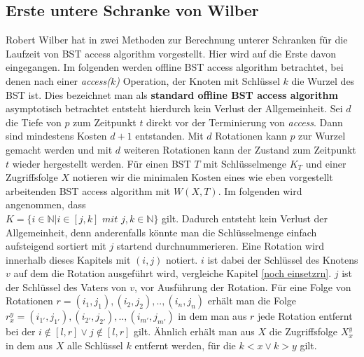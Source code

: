 \documentclass[a4paper,12pt]{article}
\begin{document}
\subsection{Erste untere Schranke von Wilber}
Robert Wilber hat in \cite{wilberLowerBounds} zwei Methoden zur Berechnung unterer Schranken für die Laufzeit von BST access algorithm vorgestellt. Hier wird auf die Erste davon eingegangen. Im folgenden werden offline BST access algorithm betrachtet, bei denen nach einer \textit{access($k$)} Operation, der Knoten mit Schlüssel $k$ die Wurzel des BST ist. Dies bezeichnet man als \textbf{standard offline BST access algorithm } asymptotisch betrachtet entsteht hierdurch kein Verlust der Allgemeinheit. Sei $d$ die Tiefe von $p$ zum Zeitpunkt $t$ direkt vor der Terminierung von \textit{access}. Dann sind mindestens Kosten $d + 1$ entstanden. Mit $d$ Rotationen kann $p$ zur Wurzel gemacht werden und mit $d$ weiteren Rotationen kann der Zustand zum Zeitpunkt $t$ wieder hergestellt werden.
Für einen BST $T$ mit Schlüsselmenge $K_T$ und einer Zugriffsfolge $X$ notieren wir die minimalen Kosten eines wie eben vorgestellt arbeitenden BST access algorithm mit $W(X, T)$. Im folgenden wird angenommen, dass \\
$K = \{  i \in \mathbb{N} \vert i \in \left[j,k\right] \textit{ mit } j,k \in  \mathbb{N} \} $ gilt. Dadurch entsteht kein Verlust der Allgemeinheit, denn anderenfalls könnte man die Schlüsselmenge einfach aufsteigend sortiert mit $j$ startend durchnummerieren. Eine Rotation wird innerhalb dieses Kapitels mit $\left(i, j\right)$ notiert. $i$ ist dabei der Schlüssel des Knotens $v$ auf dem die Rotation ausgeführt wird, vergleiche Kapitel \ref{noch einsetzrn}. $j$ ist der Schlüssel des Vaters von $v$, vor Ausführung der Rotation. Für eine Folge von Rotationen $r = \left(i_1,j_1 \right),\left(i_2,j_2 \right),..,\left(i_n,j_n \right)$ erhält man die Folge  $r^y_x = \left(i_{1'},j_{1'}\right),\left(i_{2'},j_{2'} \right),..,\left(i_{m'},j_{m'} \right)$  in dem man aus $r$ jede Rotation entfernt bei der $i\notin \left[l,r\right] \lor j\notin \left[l,r\right]$ gilt. Ähnlich erhält man aus $X$ die Zugriffsfolge $X^y_x$ in dem aus $X$ alle Schlüssel $k$ entfernt werden, für die $k < x  \lor k > y$ gilt.
\end{document}
